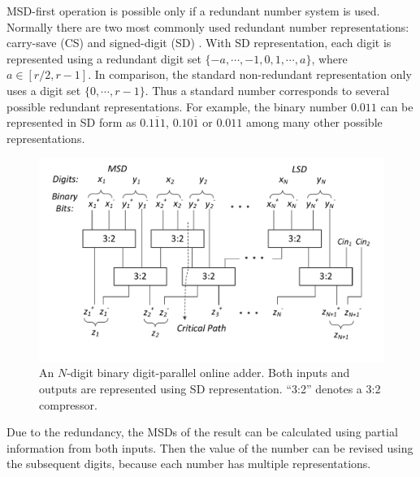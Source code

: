 \documentclass[conference]{IEEEtran}
\begin{document}
MSD-first operation is possible only if a redundant number system is used. Normally there are two most commonly used redundant number representations: carry-save (CS) \cite{CSadder} and signed-digit (SD) \cite{RedundantNumber}. With SD representation, each digit is represented using a redundant digit set $\{-a, \cdots,-1,0, 1, \cdots, a\}$, where $a\in[r/2,r-1]$. In comparison, the standard non-redundant representation only uses a digit set $\{0,\cdots,r-1\}$. Thus a standard number corresponds to several possible redundant representations. For example, the binary number $0.011$ can be represented in SD form as $0.1\overline{1}1$, $0.10\overline{1}$ or $0.011$ among many other possible representations.\vspace{-0.5ex}
%
\vspace{-.5ex}
\begin{figure}[tbp]
  \centering
  \includegraphics[width=.5\textwidth]{./Figures/SDAdder2.pdf}
    \vspace{-7ex}
  \caption{An $N$-digit binary digit-parallel online adder. Both inputs and outputs are represented using SD representation. ``3:2'' denotes a 3:2 compressor.}
    \vspace{-2ex}
  \label{Fig:Radix2SD_adder}
\end{figure}

Due to the redundancy, the MSDs of the result can be calculated using partial information from both inputs. Then the value of the number can be revised using the subsequent digits, because each number has multiple representations.\vspace{-0.5ex}
\end{document}
